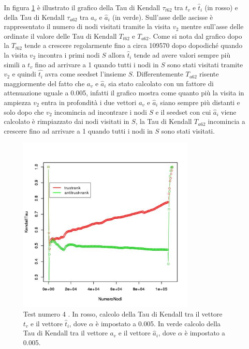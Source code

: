 In figura \ref{fig:test4coplotTrustAntiModeB620005} è illustrato il grafico della Tau di Kendall \(\tau_{t62}\) tra \(t_v\) e \(\hat{t}_i\) (in rosso)  e della Tau di Kendall \(\tau_{a62}\) tra \(a_v\) e \(\hat{a}_i\) (in verde). Sull'asse delle ascisse è rappresentato il numero di nodi visitati tramite la visita \(v_2\) mentre sull'asse delle ordinate il valore delle Tau di Kendall \(T_{t62}\) e \(T_{a62}\). Come si nota dal grafico dopo la \(T_{t62}\) tende a crescere regolarmente fino a circa 109570 dopo dopodiché quando la visita \(v_2\) incontra i primi nodi \(S\) allora \(\hat{t}_i\) tende ad avere valori sempre più simili a \(t_v\) fino ad arrivare a 1 quando tutti i nodi in \(S\) sono stati visitati tramite \(v_2\) e quindi \(\hat{t_i}\) avra come seedset l'insieme \(S\). Differentemente \(T_{a62}\) risente maggiormente del fatto che \(a_v\) e \(\hat{a}_i\) sia stato calcolato con un fattore di attenuazione uguale a 0.005, infatti il grafico mostra come quanto più la visita in ampiezza \(v_2\) entra in 
profondità i due vettori \(a_v\) e \(\hat{a}_i\) siano sempre più distanti e solo dopo che \(v_2\) incomincia ad incontrare i nodi \(S\) e il seedset con cui \(\hat{a}_i\) viene calcolato è rimpiazzato dai nodi visitati in \(S\), la Tau di Kendall \(T_{a62}\) incomincia a crescere fino ad arrivare a 1 quando tutti i nodi  in \(S\) sono stati visitati.
\begin{figure}
 \centering
 \includegraphics[height=9cm]{immagini/test4/coplotTrustAnti_Mode1_set3776_62_alpha0005}
  \caption{Test numero 4 . In rosso, calcolo della Tau di Kendall tra il vettore $t_v$ e il vettore $\hat{t}_i$, dove $\alpha$ è impostato a 0.005. In verde calcolo della Tau di Kendall tra il vettore $a_v$ e il vettore $\hat{a}_i$, dove $\alpha$ è impostato a 0.005.}
 \label{fig:test4coplotTrustAntiModeB620005}
\end{figure}

